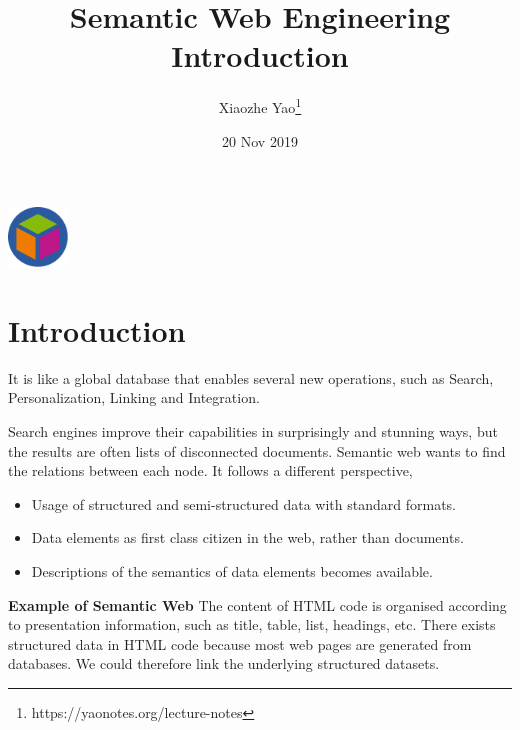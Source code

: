 \documentclass{article}
\title{Semantic Web Engineering \protect\\ Introduction}
\author{Xiaozhe Yao\footnote{https://yaonotes.org/lecture-notes}}
\date{20 Nov 2019}
\theoremstyle{definition}
\begin{document}
\maketitle
\begin{center}
    \includegraphics[width=60px]{Semantic_Web/images/semantic-web.pdf}
\end{center}
\section{Introduction}


It is like a global database that enables several new operations, such as Search, Personalization, Linking and Integration.

Search engines improve their capabilities in surprisingly and stunning ways, but the results are often lists of disconnected documents. Semantic web wants to find the relations between each node. It follows a different perspective,

\begin{itemize}
    \item Usage of structured and semi-structured data with standard formats.
    \item Data elements as first class citizen in the web, rather than documents.
    \item Descriptions of the semantics of data elements becomes available.
\end{itemize}

\textbf{Example of Semantic Web} The content of HTML code is organised according to presentation information, such as title, table, list, headings, etc. There exists structured data in HTML code because most web pages are generated from databases. We could therefore link the underlying structured datasets.
\end{document}
